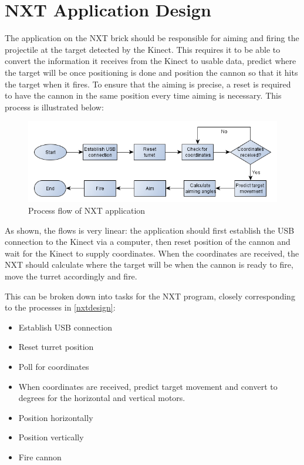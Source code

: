 \section{NXT Application Design}
The application on the NXT brick should be responsible for aiming and firing the projectile at the target detected by the Kinect. This requires it to be able to convert the information it receives from the Kinect to usable data, predict where the target will be once positioning is done and position the cannon so that it hits the target when it fires. To ensure that the aiming is precise, a reset is required to have the cannon in the same position every time aiming is necessary. This process is illustrated below:

\begin{figure}[hbtp]
	\includegraphics[scale=0.5]{img/nxtdesign.png}
	\caption{Process flow of NXT application}
	\label{nxtdesign}
\end{figure}

As shown, the flows is very linear: the application should first establish the USB connection to the Kinect via a computer, then reset position of the cannon and wait for the Kinect to supply coordinates. When the coordinates are received, the NXT should calculate where the target will be when the cannon is ready to fire, move the turret accordingly and fire.

This can be broken down into tasks for the NXT program, closely corresponding to the processes in \autoref{nxtdesign}:
\begin{itemize}
	\item Establish USB connection
	\item Reset turret position
	\item Poll for coordinates
	\item When coordinates are received, predict target movement and convert to degrees for the horizontal and vertical motors.
	\item Position horizontally
	\item Position vertically
	\item Fire cannon
\end{itemize}

